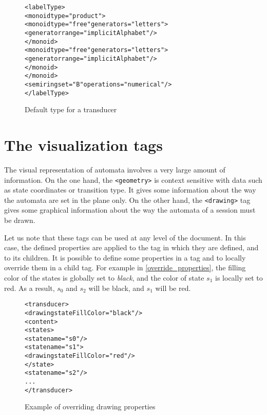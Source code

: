 \documentclass[a4paper]{article}
\newcommand{\xtag}[1]{\texttt{<#1>}}
\def\geometrytag{\xtag{geometry}}
\def\drawingtag{\xtag{drawing}}
\begin{document}
\begin{figure}[ht]
  \begin{center}
\begin{alltt}
<labelType>
  <monoid type="product">
     <monoid type="free" generators="letters">
       <generator range="implicitAlphabet"/>
     </monoid>
     <monoid type="free" generators="letters">
       <generator range="implicitAlphabet"/>
     </monoid>
  </monoid>
  <semiring set="B" operations="numerical"/>
</labelType>
\end{alltt}

\caption{Default type for a transducer}
\label{transducertype}
  \end{center}
\end{figure}

\newpage
\section{The visualization tags}
\label{title_vizualisation}
The visual representation of automata involves a very large amount of
information. On the one hand, the \geometrytag{} is context sensitive
with data such as state coordinates or transition type. It gives some
information about the way the automata are set in the plane only.  On
the other hand, the \drawingtag{} tag gives some graphical information
about the way the automata of a session must be drawn.

Let us note that these tags can be used at any level of the document.
In this case, the defined properties are applied to the tag in which
they are defined, and to its children. It is possible to define some
properties in a tag and to locally override them in a child tag. For
example in \autoref{override_properties}, the filling color of the
states is globally set to \textit{black}, and the color of state $s_1$
is locally set to red. As a result, $s_0$ and $s_2$ will be black, and
$s_1$ will be red.

\begin{figure}[ht]
  \small
  \begin{center}
\begin{alltt}
<transducer>
  <drawing stateFillColor="black"/>
  <content>
     <states>
        <state name="s0"/>
        <state name="s1">
            <drawing stateFillColor="red"/>
        </state>
        <state name="s2"/>
      ...
</transducer>
\end{alltt}

    \caption{Example of overriding drawing properties}
    \label{override_properties}
  \end{center}
\end{figure}
\end{document}
